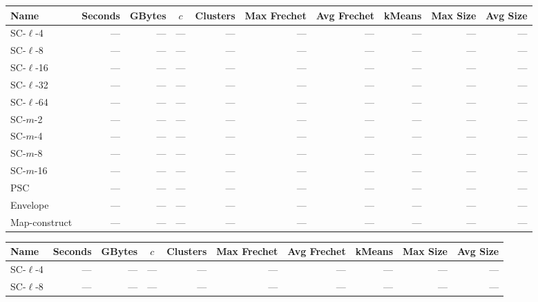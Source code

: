 \clearpage
\newpage 
%
%
\clearpage
\begin{figure} \begin{center}
    \begin{minipage}{\textwidth}
    {
    \begin{tabular}{@{}lrrcrrrrrr@{}}
        \toprule
        Name & Seconds & GBytes & $c$ & Clusters & Max Frechet & Avg Frechet & kMeans & Max Size & Avg Size\\
        \midrule
        SC-$\ell$-4 & --- & --- & --- & --- & --- & --- & --- & --- & ---\\
        SC-$\ell$-8 & --- & --- & --- & --- & --- & --- & --- & --- & ---\\
        SC-$\ell$-16 & --- & --- & --- & --- & --- & --- & --- & --- & ---\\
        SC-$\ell$-32 & --- & --- & --- & --- & --- & --- & --- & --- & ---\\
        SC-$\ell$-64 & --- & --- & --- & --- & --- & --- & --- & --- & ---\\
        SC-$m$-2 & --- & --- & --- & --- & --- & --- & --- & --- & ---\\
        SC-$m$-4 & --- & --- & --- & --- & --- & --- & --- & --- & ---\\
        SC-$m$-8 & --- & --- & --- & --- & --- & --- & --- & --- & ---\\
        SC-$m$-16 & --- & --- & --- & --- & --- & --- & --- & --- & ---\\
        PSC & --- & --- & --- & --- & --- & --- & --- & --- & ---\\
        Envelope & --- & --- & --- & --- & --- & --- & --- & --- & ---\\
        Map-construct & --- & --- & --- & --- & --- & --- & --- & --- & ---\\
        \bottomrule
    \end{tabular}
    }
    {
    \begin{tabular}{@{}lrrcrrrrrr@{}}
        \toprule
        Name & Seconds & GBytes & $c$ & Clusters & Max Frechet & Avg Frechet & kMeans & Max Size & Avg Size\\
        \midrule
        SC-$\ell$-4 & --- & --- & --- & --- & --- & --- & --- & --- & ---\\
        SC-$\ell$-8 & --- & --- & --- & --- & --- & --- & --- & --- & ---\\

\end{tabular}}
\end{minipage}
\end{center}
\end{figure}
